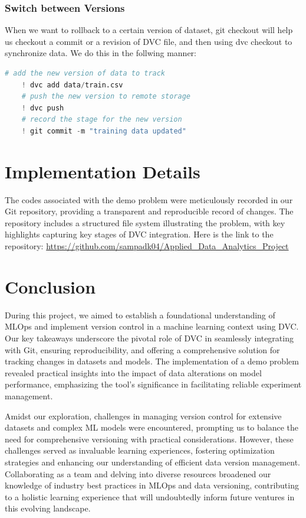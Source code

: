 \documentclass[12pt]{article}
\begin{document}
\subsubsection{Switch between Versions}

When we want to rollback to a certain version of dataset, git checkout will help us checkout a commit or a revision of DVC file, and then using dvc checkout to synchronize data. We do this in the follwing manner:
\medskip
\begin{lstlisting}[language=Python]
    # add the new version of data to track
    ! dvc add data/train.csv
    # push the new version to remote storage
    ! dvc push
    # record the stage for the new version
    ! git commit -m "training data updated"
\end{lstlisting}

\section{Implementation Details}

The codes associated with the demo problem were meticulously recorded in our Git repository, providing a transparent and reproducible record of changes. The repository includes a structured file system illustrating the problem, with key highlights capturing key stages of DVC integration. Here is the link to the repository: \url{https://github.com/sampadk04/Applied_Data_Analytics_Project}

\newpage

\section{Conclusion}

During this project, we aimed to establish a foundational understanding of MLOps and implement version control in a machine learning context using DVC. Our key takeaways underscore the pivotal role of DVC in seamlessly integrating with Git, ensuring reproducibility, and offering a comprehensive solution for tracking changes in datasets and models. The implementation of a demo problem revealed practical insights into the impact of data alterations on model performance, emphasizing the tool's significance in facilitating reliable experiment management.

Amidst our exploration, challenges in managing version control for extensive datasets and complex ML models were encountered, prompting us to balance the need for comprehensive versioning with practical considerations. However, these challenges served as invaluable learning experiences, fostering optimization strategies and enhancing our understanding of efficient data version management. Collaborating as a team and delving into diverse resources broadened our knowledge of industry best practices in MLOps and data versioning, contributing to a holistic learning experience that will undoubtedly inform future ventures in this evolving landscape.
\end{document}

